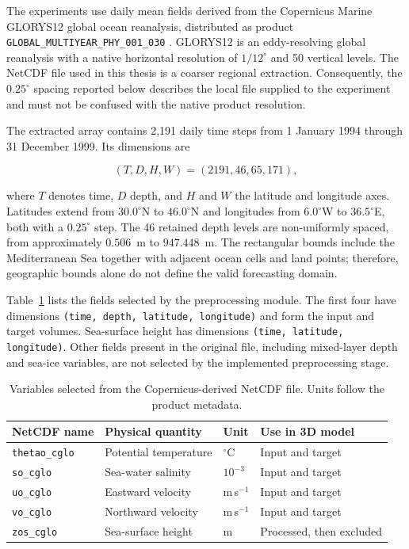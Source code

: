 The experiments use daily mean fields derived from the Copernicus Marine GLORYS12 global ocean reanalysis, distributed as product \texttt{GLOBAL\_MULTIYEAR\_PHY\_001\_030} \citep{copernicusglorys12,lellouche2021glorys12}. GLORYS12 is an eddy-resolving global reanalysis with a native horizontal resolution of $1/12^{\circ}$ and 50 vertical levels. The NetCDF file used in this thesis is a coarser regional extraction. Consequently, the $0.25^{\circ}$ spacing reported below describes the local file supplied to the experiment and must not be confused with the native product resolution.

The extracted array contains 2,191 daily time steps from 1 January 1994 through 31 December 1999. Its dimensions are

\[
(T,D,H,W)=(2191,46,65,171),
\]

where $T$ denotes time, $D$ depth, and $H$ and $W$ the latitude and longitude axes. Latitudes extend from $30.0^{\circ}$N to $46.0^{\circ}$N and longitudes from $6.0^{\circ}$W to $36.5^{\circ}$E, both with a $0.25^{\circ}$ step. The 46 retained depth levels are non-uniformly spaced, from approximately $0.506$~m to $947.448$~m. The rectangular bounds include the Mediterranean Sea together with adjacent ocean cells and land points; therefore, geographic bounds alone do not define the valid forecasting domain.

Table~\ref{tab:dataset-variables} lists the fields selected by the preprocessing module. The first four have dimensions \texttt{(time, depth, latitude, longitude)} and form the input and target volumes. Sea-surface height has dimensions \texttt{(time, latitude, longitude)}. Other fields present in the original file, including mixed-layer depth and sea-ice variables, are not selected by the implemented preprocessing stage.

\begin{table}[htbp]
\centering
\small
\caption{Variables selected from the Copernicus-derived NetCDF file. Units follow the product metadata.}
\label{tab:dataset-variables}
\begin{tabular}{llll}
\toprule
NetCDF name & Physical quantity & Unit & Use in 3D model \\
\midrule
\texttt{thetao\_cglo} & Potential temperature & $^{\circ}$C & Input and target \\
\texttt{so\_cglo} & Sea-water salinity & $10^{-3}$ & Input and target \\
\texttt{uo\_cglo} & Eastward velocity & m\,s$^{-1}$ & Input and target \\
\texttt{vo\_cglo} & Northward velocity & m\,s$^{-1}$ & Input and target \\
\texttt{zos\_cglo} & Sea-surface height & m & Processed, then excluded \\
\bottomrule
\end{tabular}
\end{table}

